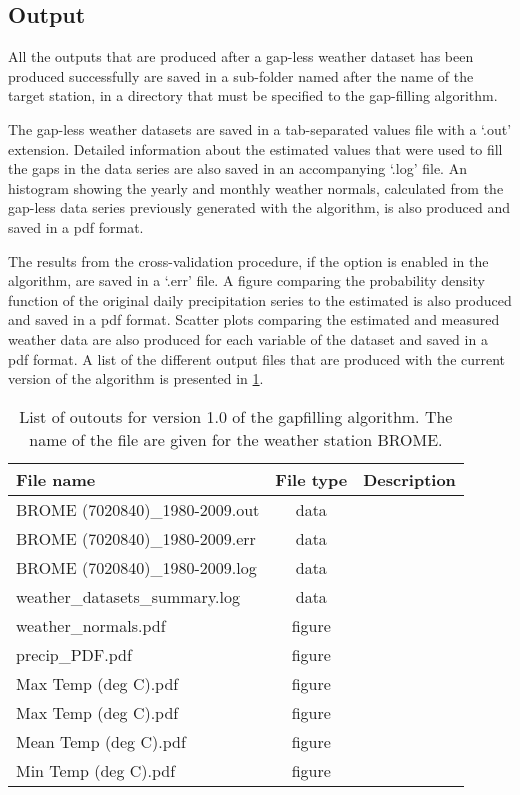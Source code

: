 \documentclass[TechnicalNoteMeteo.tex]{subfiles}
\begin{document}
\subsection{Output}\label{sec:output}

All the outputs that are produced after a gap-less weather dataset has been produced successfully are saved in a sub-folder named after the name of the target station, in a directory that must be specified to the gap-filling algorithm.

The gap-less weather datasets are saved in a tab-separated values file with a `.out' extension. Detailed information about the estimated values that were used to fill the gaps in the data series are also saved in an accompanying `.log' file. An histogram showing the yearly and monthly weather normals, calculated from the gap-less data series previously generated with the algorithm, is also produced and saved in a pdf format. 

The results from the cross-validation procedure, if the option is enabled in the algorithm, are saved in a `.err' file. A figure comparing the probability density function of the original daily precipitation series to the estimated is also produced and saved in a pdf format. Scatter plots comparing the estimated and measured weather data are also produced for each variable of the dataset and saved in a pdf format. A list of the different output files that are produced with the current version of the algorithm is presented in \cref{tab:output_files}.

\begin{table}[!ht]
    \centering
    \caption{List of outouts for version 1.0 of the gapfilling algorithm. The name of the file are given for the weather station BROME.}
    \begin{tabular}{lcp{8.5cm}}
        \toprule
        File name & File type & Description\\
        \midrule
        BROME (7020840)\_1980-2009.out & data & \\[1em]
        BROME (7020840)\_1980-2009.err & data & \\[1em]
        BROME (7020840)\_1980-2009.log & data & \\[1em]  
        weather\_datasets\_summary.log & data & \\[1em]       
        weather\_normals.pdf & figure & \\[1em]
        precip\_PDF.pdf  & figure & \\[1em]
        Max Temp (deg C).pdf & figure & \\[1em]
        Max Temp (deg C).pdf & figure & \\[1em]
        Mean Temp (deg C).pdf & figure & \\[1em]
        Min Temp (deg C).pdf & figure & \\
        \bottomrule
    \end{tabular}
    \label{tab:output_files}
\end{table}
\end{document}
